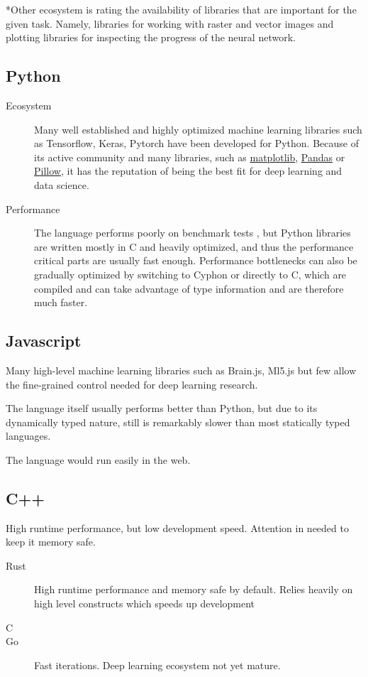 \documentclass[12pt, a4paper, titlepage]{report}
\begin{document}
*Other ecosystem is rating the availability of libraries that are important for the given task. Namely, libraries for working with raster and vector images and plotting libraries for inspecting the progress of the neural network.

{
   \center
   \subsection*{Python}
}
\begin{description}
   \item[Ecosystem] Many well established and highly optimized machine learning libraries such as Tensorflow, Keras, Pytorch have been developed for Python. Because of its active community and many libraries, such as \href{}{matplotlib}, \href{}{Pandas} or \href{}{Pillow}, it has the reputation of being the best fit for deep learning and data science.
   \item[Performance] The language performs poorly on benchmark tests \cite{goodmanwen_programming-language-benchmarks-visualization_2023}, but Python libraries are written mostly in C and heavily optimized, and thus the performance critical parts are usually fast enough. Performance bottlenecks can also be gradually optimized by switching to Cyphon or directly to C, which are compiled and can take advantage of type information and are therefore much faster.
\end{description}

{
   \center
   \subsection*{Javascript}
}
\begin{description}
   \item[Ecosystem] Many high-level machine learning libraries such as Brain.js, Ml5.js but few allow the fine-grained control needed for deep learning research.
   \item The language itself usually performs better than Python, but due to its dynamically typed nature, still is remarkably slower than most statically typed languages.
   \item[Other remarks] The language would run easily in the web.
\end{description}

{
   \center
   \subsection*{C++} High runtime performance, but low development speed. Attention in needed to keep it memory safe.
}
\begin{description}
   \item[Rust] High runtime performance and memory safe by default. Relies heavily on high level constructs which speeds up development 
   \item[C] 
   \item[Go] Fast iterations. Deep learning ecosystem not yet mature.
\end{description}
\end{document}
